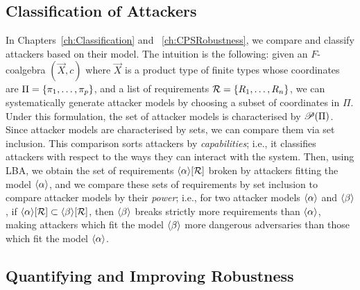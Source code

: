 \subsection{Classification of Attackers}
\label{sec:Latent:Classification}
In Chapters~\ref{ch:Classification} and ~\ref{ch:CPSRobustness}, we compare and classify attackers based on their model. The intuition is the following: given an $F$-coalgebra $(\vec{X},c)$ where $\vec{X}$ is a product type of finite types whose coordinates are $\Pi=\left\{\pi_1,\ldots,\pi_p\right\}$, and a list of requirements $\mathcal{R}=\left\{R_1, \ldots, R_n\right\}$, we can systematically generate attacker models by choosing a subset of coordinates in $\Pi$. Under this formulation, the set of attacker models is characterised by ${{\mathscr{P}}\!\left({\Pi}\right)}$. Since attacker models are characterised by sets, we can compare them via set inclusion. This comparison sorts attackers by \emph{capabilities}; i.e., it classifies attackers with respect to the ways they can interact with the system. Then, using LBA, we obtain the set of requirements ${{\left<\alpha\right>}}[\mathcal{R}]$ broken by attackers fitting the model ${{\left<\alpha\right>}}$, and we compare these sets of requirements by set inclusion to compare attacker models by their \emph{power}; i.e., for two attacker models ${{\left<\alpha\right>}}$ and ${{\left<\beta\right>}}$, if ${{\left<\alpha\right>}}[\mathcal{R}]\subset {{\left<\beta\right>}}[\mathcal{R}]$, then ${{\left<\beta\right>}}$ breaks strictly more requirements than ${{\left<\alpha\right>}}$, making attackers which fit the model ${{\left<\beta\right>}}$ more dangerous adversaries than those which fit the model ${{\left<\alpha\right>}}$.%


\subsection{Quantifying and Improving Robustness}
\label{sec:Latent:Robustness}

